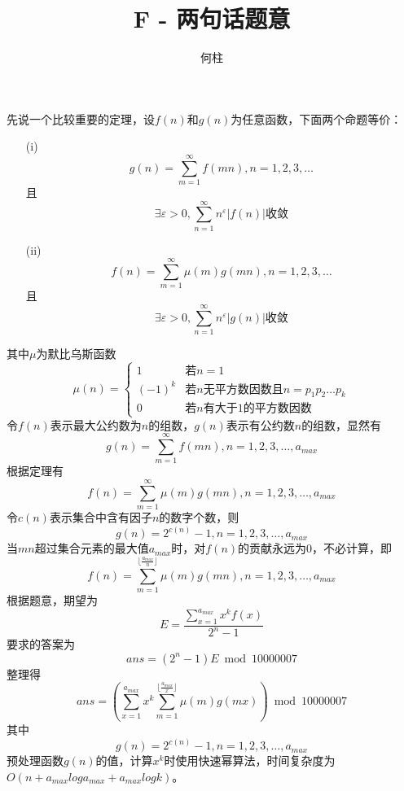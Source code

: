 \documentclass[a4paper]{ctexart}
\title{F - 两句话题意}
\author{何柱}
\begin{document}
	\maketitle
	先说一个比较重要的定理，设$f(n)$和$g(n)$为任意函数，下面两个命题等价：
	\begin{enumerate}
		\item[(i)] $$g(n)=\sum_{m=1}^{\infty}f(mn),n=1,2,3,\ldots$$
		且
		$$\exists\varepsilon>0,\sum_{n=1}^{\infty}n^\varepsilon|f(n)|\text{收敛}$$
		\item[(ii)] $$f(n)=\sum_{m=1}^{\infty}\mu(m)g(mn),n=1,2,3,\ldots$$
		且
		$$\exists\varepsilon>0,\sum_{n=1}^{\infty}n^\varepsilon|g(n)|\text{收敛}$$
	\end{enumerate}
	其中$\mu$为默比乌斯函数
	$$\mu(n)=\begin{cases}
	1 & \text{若}n=1 \\
	(-1)^k & \text{若}n\text{无平方数因数且}n=p_1p_2\ldots p_k \\
	0 & \text{若}n\text{有大于}1\text{的平方数因数}
	\end{cases}$$
	令$f(n)$表示最大公约数为$n$的组数，$g(n)$表示有公约数$n$的组数，显然有
	$$g(n)=\sum_{m=1}^{\infty}f(mn),n=1,2,3,\ldots,a_{max}$$
	根据定理有
	$$f(n)=\sum_{m=1}^{\infty}\mu(m)g(mn),n=1,2,3,\ldots,a_{max}$$
	令$c(n)$表示集合中含有因子$n$的数字个数，则
	$$g(n)=2^{c(n)}-1,n=1,2,3,\ldots,a_{max}$$
	当$mn$超过集合元素的最大值$a_{max}$时，对$f(n)$的贡献永远为$0$，不必计算，即
	$$f(n)=\sum_{m=1}^{\lfloor\frac{a_{max}}{n}\rfloor}\mu(m)g(mn),n=1,2,3,\ldots,a_{max}$$
	根据题意，期望为
	$$E=\frac{\sum_{x=1}^{a_{max}}x^kf(x)}{2^n-1}$$
	要求的答案为
	$$ans=(2^n-1)E \bmod 10000007$$
	整理得
	$$ans=(\sum_{x=1}^{a_{max}}x^k\sum_{m=1}^{\lfloor\frac{a_{max}}{x}\rfloor}\mu(m)g(mx)) \bmod 10000007$$
	其中
	$$g(n)=2^{c(n)}-1,n=1,2,3,\ldots,a_{max}$$
	预处理函数$g(n)$的值，计算$x^k$时使用快速幂算法，时间复杂度为$O(n+a_{max}loga_{max}+a_{max}logk)$。
\end{document}
